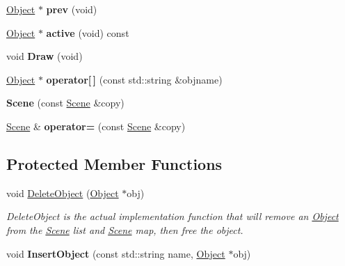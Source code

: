 \begin{DoxyCompactItemize}
\item 
\hypertarget{class_scene_ac852d5d763eb35b4908c9aa7ea54d1ae}{\hyperlink{class_object}{Object} $\ast$ {\bfseries prev} (void)}\label{class_scene_ac852d5d763eb35b4908c9aa7ea54d1ae}

\item 
\hypertarget{class_scene_ad0ea1a6bcf7815c63988bd937f06eb23}{\hyperlink{class_object}{Object} $\ast$ {\bfseries active} (void) const }\label{class_scene_ad0ea1a6bcf7815c63988bd937f06eb23}

\item 
\hypertarget{class_scene_ad5a91c929b569b9111061eec16b3febf}{void {\bfseries Draw} (void)}\label{class_scene_ad5a91c929b569b9111061eec16b3febf}

\item 
\hypertarget{class_scene_ae9b69d8db8a46991017635f22e45baad}{\hyperlink{class_object}{Object} $\ast$ {\bfseries operator\mbox{[}$\,$\mbox{]}} (const std\-::string \&objname)}\label{class_scene_ae9b69d8db8a46991017635f22e45baad}

\item 
\hypertarget{class_scene_aa6e6354478dc7df82446b3abf9f91d96}{{\bfseries Scene} (const \hyperlink{class_scene}{Scene} \&copy)}\label{class_scene_aa6e6354478dc7df82446b3abf9f91d96}

\item 
\hypertarget{class_scene_a6336263b33b06ce4ace53599ffd8122c}{\hyperlink{class_scene}{Scene} \& {\bfseries operator=} (const \hyperlink{class_scene}{Scene} \&copy)}\label{class_scene_a6336263b33b06ce4ace53599ffd8122c}

\end{DoxyCompactItemize}
\subsection*{Protected Member Functions}
\begin{DoxyCompactItemize}
\item 
void \hyperlink{class_scene_a8bbe0e5b1bfc71034b18e240e86aa285}{Delete\-Object} (\hyperlink{class_object}{Object} $\ast$obj)
\begin{DoxyCompactList}\small\item\em Delete\-Object is the actual implementation function that will remove an \hyperlink{class_object}{Object} from the \hyperlink{class_scene}{Scene} list and \hyperlink{class_scene}{Scene} map, then free the object. \end{DoxyCompactList}\item 
\hypertarget{class_scene_ae8d51ddc196248a7cbd1f3640851dbd4}{void {\bfseries Insert\-Object} (const std\-::string name, \hyperlink{class_object}{Object} $\ast$obj)}\label{class_scene_ae8d51ddc196248a7cbd1f3640851dbd4}

\end{DoxyCompactItemize}
